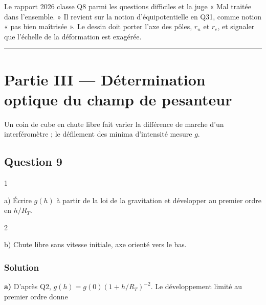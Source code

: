 \documentclass[11pt,a4paper]{article}
\begin{document}
\begin{jury}

Le rapport 2026 classe Q8 parmi les questions difficiles et la juge « Mal traitée dans l'ensemble. » Il revient sur la notion d'équipotentielle en Q31, comme notion « pas bien maîtrisée ». Le dessin doit porter l'axe des pôles, \(r_n\) et \(r_e\), et signaler que l'échelle de la déformation est exagérée.

\end{jury}

\begin{center}\rule{0.5\linewidth}{0.5pt}\end{center}

\hypertarget{partie-iii-duxe9termination-optique-du-champ-de-pesanteur}{%
\section{Partie III --- Détermination optique du champ de pesanteur}\label{partie-iii-duxe9termination-optique-du-champ-de-pesanteur}}

Un coin de cube en chute libre fait varier la différence de marche d'un interféromètre ; le défilement des minima d'intensité mesure \(g\).

\hypertarget{question-9}{%
\subsection{Question 9}\label{question-9}}

\begin{indication}{1}

a) Écrire \(g(h)\) à partir de la loi de la gravitation et développer au premier ordre en \(h/R_T\).

\end{indication}

\begin{indication}{2}

b) Chute libre sans vitesse initiale, axe orienté vers le bas.

\end{indication}

\hypertarget{solution-8}{%
\subsubsection{Solution}\label{solution-8}}

\textbf{a)} D'après Q2, \(g(h)=g(0)(1+h/R_T)^{-2}\). Le développement limité au premier ordre donne
\end{document}
